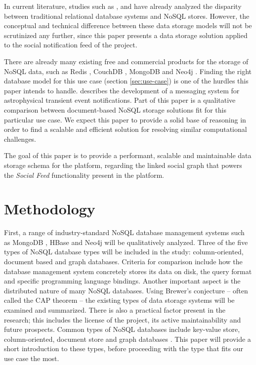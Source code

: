 \documentclass[fleqn,10pt]{voorstel}
\begin{document}
In current literature, studies such as \textcite{Moniruzzaman2013}, \textcite{NayakPoriyaPoojary2003} and \textcite{HammesMederoMitchell2014} have already analyzed the disparity between traditional relational database systems and NoSQL stores.
However, the conceptual and technical difference between these data storage models will not be scrutinized any further, since this paper presents a data storage solution applied to the social notification feed of the \textcite{OpenWebslides} project.

There are already many existing free and commercial products for the storage of NoSQL data, such as Redis \autocite{Redis}, CouchDB \autocite{CouchDB}, MongoDB \autocite{MongoDB} and Neo4j \autocite{Neo4j}. Finding the right database model for this use case (section \ref{sec:use-case}) is one of the hurdles this paper intends to handle. \textcite{Zhao2015} describes the development of a messaging system for astrophysical transient event notifications. Part of this paper is a qualitative comparison between document-based NoSQL storage solutions fit for this particular use case. We expect this paper to provide a solid base of reasoning in order to find a scalable and efficient solution for resolving similar computational challenges.

The goal of this paper is to provide a performant, scalable and maintainable data storage schema for the \textcite{OpenWebslides} platform, regarding the linked social graph that powers the \textit{Social Feed} functionality present in the platform.


\section{Methodology}
\label{sec:methodology}

First, a range of industry-standard NoSQL database management systems such as MongoDB \autocite{MongoDB}, HBase \autocite{HBase} and Neo4j \autocite{Neo4j} will be qualitatively analyzed. Three of the five types of NoSQL database types \autocite{NayakPoriyaPoojary2003} will be included in the study: column-oriented, document based and graph databases. Criteria for comparison include how the database management system concretely stores its data on disk, the query format and specific programming language bindings. Another important aspect is the distributed nature of many NoSQL databases. Using Brewer's conjecture \autocite{Brewer2002} -- often called the CAP theorem -- the existing types of data storage systems will be examined and summarized. There is also a practical factor present in the research; this includes the license of the project, its active maintainability and future prospects.
Common types of NoSQL databases include key-value store, column-oriented, document store and graph databases \autocite{NayakPoriyaPoojary2003}. This paper will provide a short introduction to these types, before proceeding with the type that fits our use case the most.
\end{document}
